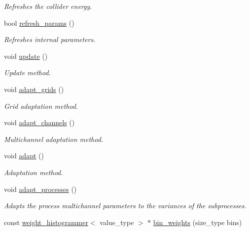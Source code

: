 \begin{DoxyCompactItemize}
\begin{DoxyCompactList}\small\item\em Refreshes the collider energy. \end{DoxyCompactList}\item 
\hypertarget{a00212_aa8ffb17e3fc087485af4e62493e299c1}{}bool \hyperlink{a00212_aa8ffb17e3fc087485af4e62493e299c1}{refresh\+\_\+params} ()\label{a00212_aa8ffb17e3fc087485af4e62493e299c1}

\begin{DoxyCompactList}\small\item\em Refreshes internal parameters. \end{DoxyCompactList}\item 
\hypertarget{a00212_a098839f6765c509366d5b4f4db22b762}{}void \hyperlink{a00212_a098839f6765c509366d5b4f4db22b762}{update} ()\label{a00212_a098839f6765c509366d5b4f4db22b762}

\begin{DoxyCompactList}\small\item\em Update method. \end{DoxyCompactList}\item 
\hypertarget{a00212_ab6f503920b9a99fc579cb868f2678127}{}void \hyperlink{a00212_ab6f503920b9a99fc579cb868f2678127}{adapt\+\_\+grids} ()\label{a00212_ab6f503920b9a99fc579cb868f2678127}

\begin{DoxyCompactList}\small\item\em Grid adaptation method. \end{DoxyCompactList}\item 
\hypertarget{a00212_af6256418b88f029197e80ff36c176c59}{}void \hyperlink{a00212_af6256418b88f029197e80ff36c176c59}{adapt\+\_\+channels} ()\label{a00212_af6256418b88f029197e80ff36c176c59}

\begin{DoxyCompactList}\small\item\em Multichannel adaptation method. \end{DoxyCompactList}\item 
\hypertarget{a00212_a47b3c2a1dd77d0f6537bf973e82ccab6}{}void \hyperlink{a00212_a47b3c2a1dd77d0f6537bf973e82ccab6}{adapt} ()\label{a00212_a47b3c2a1dd77d0f6537bf973e82ccab6}

\begin{DoxyCompactList}\small\item\em Adaptation method. \end{DoxyCompactList}\item 
void \hyperlink{a00212_addbfc929e753761773ff755ed3fff5dc}{adapt\+\_\+processes} ()
\begin{DoxyCompactList}\small\item\em Adapts the process multichannel parameters to the variances of the subprocesses. \end{DoxyCompactList}\item 
\hypertarget{a00212_a8138a6a1c736c588f0b4298e7f118719}{}const \hyperlink{a00596}{weight\+\_\+histogrammer}$<$ value\+\_\+type $>$ $\ast$ \hyperlink{a00212_a8138a6a1c736c588f0b4298e7f118719}{bin\+\_\+weights} (size\+\_\+type bins)\label{a00212_a8138a6a1c736c588f0b4298e7f118719}


\end{DoxyCompactItemize}
